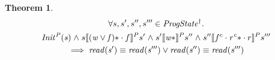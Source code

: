 \documentclass[letterpaper,twocolumn,10pt]{article}
\newtheorem{theorem}{Theorem}[section]
\theoremstyle{definition}
\newcommand{\conj}{\mathrel\land}
\renewcommand{\i}[1]{\ensuremath{\mathit{#1}}}
\begin{document}
\begin{theorem}
\begin{multline*}
      \forall s, s', s'', s''' \in \i{ProgState^\dagger} \ldotp\\\i{Init^P(s)} \conj s \llbracket \i{(w \lor f)\ast} \cdot f \rrbracket^P s' \conj
      s' \llbracket \i{w\ast} \rrbracket^P s'' \conj
      s'' \llbracket f^c \cdot \i{r^c\ast} \cdot r \rrbracket^P s'''\\
      \implies \i{read(s')} \equiv \i{read(s''')} \lor \i{read(s'')} \equiv \i{read(s''')}
\end{multline*}
\end{theorem}
\end{document}

